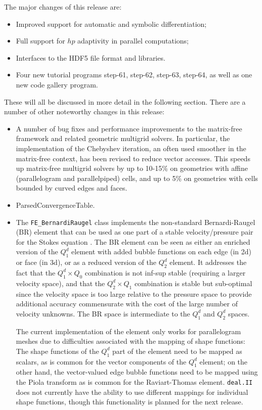 \documentclass{ansarticle-preprint}
\newcommand{\specialword}[1]{\texttt{#1}}
\newcommand{\dealii}{{\specialword{deal.II}}\xspace}
\begin{document}
The major changes of this release are:
\begin{itemize}
\item Improved support for automatic and symbolic differentiation;
\item Full support for $hp$ adaptivity in parallel computations;
\item Interfaces to the HDF5 file format and libraries.
\item Four new tutorial programs step-61, step-62, step-63, step-64,
  as well as one new code gallery program.
\end{itemize}
These will all be discussed in more detail in the
following section. There are a number of other noteworthy changes in this release:
\begin{itemize}
\item A number of bug fixes and performance improvements to the
  matrix-free framework and related geometric multigrid solvers. In
  particular, the implementation of the Chebyshev iteration, an often
  used smoother in the matrix-free context, has been revised to reduce
  vector accesses. This speeds up matrix-free
  multigrid solvers by up to 10-15\% on geometries with affine
  (parallelogram and parallelpiped) cells, and up to
  5\% on geometries with cells bounded by curved edges and faces.
\item ParsedConvergenceTable.  
\item The \texttt{FE\_BernardiRaugel} class implements the
  non-standard Bernardi-Raugel (BR) element that can be used as one part of
  a stable velocity/pressure pair for the Stokes equation
  \cite{BR85}. The BR element can be seen as either an enriched
  version of the $Q_1^d$ element with added bubble functions on each
  edge (in 2d) or face (in 3d), or as a reduced version of the $Q_2^d$
  element. It addresses the fact that the $Q_1^d\times Q_0$
  combination is not inf-sup stable (requiring a larger velocity
  space), and that the $Q_2^d\times Q_1$ combination is stable but
  sub-optimal since the velocity space is too large relative to the
  pressure space to provide additional accuracy commensurate with the
  cost of the large number of velocity unknowns. The BR space is
  intermediate to the $Q_1^d$ and $Q_2^d$ spaces.

  The current implementation of the element only works for
  parallelogram meshes due to difficulties associated with the mapping
  of shape functions: The shape functions of the $Q_1^d$ part of the
  element need to be mapped as scalars, as is common for the vector
  components of the $Q_1^d$ element; on the other hand, the
  vector-valued edge bubble functions need to be mapped using the
  Piola transform as is common for the Raviart-Thomas
  element. \dealii{} does not currently have the ability to use
  different mappings for individual shape functions, though this
  functionality is planned for the next release.
  

\end{itemize}
\end{document}
